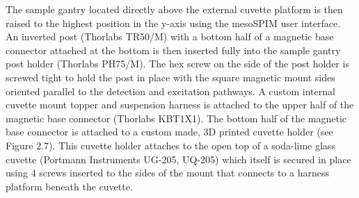 The sample gantry located directly above the external cuvette platform is then raised to the highest position in the y-axis using the mesoSPIM user interface. An inverted post (Thorlabs TR50/M) with a bottom half of a magnetic base connector attached at the bottom is then inserted fully into the sample gantry post holder (Thorlabs PH75/M). The hex screw on the side of the post holder is screwed tight to hold the post in place with the square magnetic mount sides oriented parallel to the detection and excitation pathways. A custom internal cuvette mount topper and suspension harness is attached to the upper half of the magnetic base connector (Thorlabs KBT1X1). The bottom half of the magnetic base connector is attached to a custom made, 3D printed cuvette holder (see Figure 2.7). This cuvette holder attaches to the open top of a soda-lime glass cuvette (Portmann Instruments UG-205, UQ-205) which itself is secured in place using 4 screws inserted to the sides of the mount that connects to a harness platform beneath the cuvette. 



